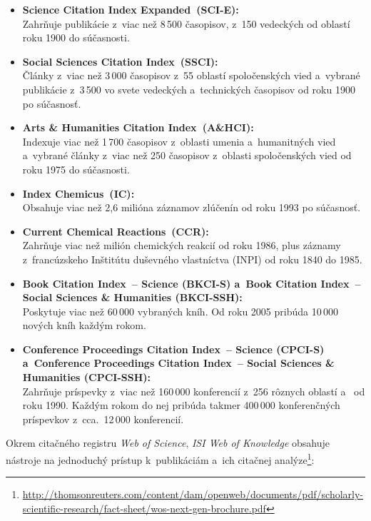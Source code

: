 \begin{itemize}
\item \textbf{Science Citation Index Expanded\R\ (SCI-E):}\\
  Zahrňuje publikácie z~viac než 8\,500 časopisov, z~150 vedeckých od oblastí
  roku 1900 do súčasnosti.
\item \textbf{Social Sciences Citation Index\R\ (SSCI):}\\
  Články z~viac než 3\,000 časopisov z~55 oblastí spoločenských vied a~vybrané
  publikácie z~3\,500 vo svete vedeckých a~technických časopisov od roku 1900 po
  súčasnosť.
\item \textbf{Arts \& Humanities Citation Index\R\ (A\&HCI):}\\
  Indexuje viac než 1\,700 časopisov z~oblasti umenia a~humanitných vied
  a~vybrané články z~viac než 250 časopisov z~oblasti spoločenských vied od roku
  1975 do súčasnosti.
\item \textbf{Index Chemicus\R\ (IC):}\\
  Obsahuje viac než 2,6 milióna záznamov zlúčenín od roku 1993 po súčasnosť.
\item \textbf{Current Chemical Reactions\R\ (CCR):}\\
  Zahrňuje viac než milión chemických reakcií od roku 1986, plus záznamy
  z~francúzskeho Inštitútu duševného vlastníctva (INPI) od roku 1840 do 1985.
\item \textbf{Book Citation Index\R\ -- Science (BKCI-S) a~Book Citation
    Index\R\ -- Social Sciences \& Humanities (BKCI-SSH):}\\
  Poskytuje viac než 60\,000 vybraných kníh.  Od roku 2005 pribúda 10\,000
  nových kníh každým rokom.
\item \textbf{Conference Proceedings Citation Index\R\ -- Science (CPCI-S)
    a~Conference Proceedings Citation Index\R\ -- Social Sciences \& Humanities
    (CPCI-SSH):}\\ Zahrňuje príspevky z~viac než 160\,000 konferencií z~256
  rôznych oblastí  a~ od roku 1990.  Každým rokom do nej pribúda takmer 400\,000
  konferenčných príspevkov z~cca.~12\,000 konferencií.
\end{itemize}


Okrem citačného registru \emph{Web of Science}, \emph{ISI Web of Knowledge}
obsahuje nástroje na jednoduchý prístup k~publikáciám a~ich citačnej
analýze\footnote{\url{http://thomsonreuters.com/content/dam/openweb/documents/pdf/scholarly-scientific-research/fact-sheet/wos-next-gen-brochure.pdf}}:

